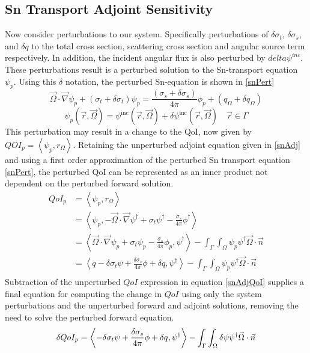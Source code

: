 \documentclass{article}
\newcommand{\vr}{\vec{r}}
\newcommand{\vO}{\vec{\Omega}}
\newcommand{\bra}{\left\langle}
\newcommand{\ket}{\right\rangle}
\newcommand{\vgrad}{\vec{\nabla}}
\newcommand{\sigt}{\sigma_t}
\newcommand{\sigs}{\sigma_s}
\newcommand{\angSource}{q_\Omega}
\newcommand{\scalSource}{q}
\newcommand{\angResp}{r_\Omega}
\begin{document}
\subsection{Sn Transport Adjoint Sensitivity}
Now consider perturbations to our system. Specifically perturbations of $\delta \sigt$, $\delta \sigs$, and $\delta q$ to the total cross section, scattering cross section and angular source term respectively. In addition, the incident angular flux is also perturbed by $delta \psi^{inc}$. These perturbations result is a perturbed solution to the Sn-transport equation $\psi_p$. Using this $\delta$ notation, the perturbed Sn-equation is shown in \ref{snPert}
\begin{equation}
\label{snPert}
\vO \cdot \vgrad \psi_p + \left( \sigt + \delta \sigt \right) \psi_p = \frac{\left( \sigs + \delta \sigs \right)}{4 \pi} \phi_p + \left( \angSource + \delta \angSource \right)
\end{equation}
\begin{equation}
\psi_p(\vr,\vO) = \psi^{\text{inc}}(\vr,\vO) + \delta \psi^{\text{inc}}(\vr,\vO)\quad \vr \in \Gamma
\end{equation}
This perturbation may result in a change to the QoI, now given by $QOI_p=\bra \psi_p , \angResp \ket$. Retaining the unperturbed adjoint equation given in \ref{snAdj} and using a first order approximation of the perturbed Sn transport equation \ref{snPert}, the perturbed QoI can be represented as an inner product not dependent on the perturbed forward solution.
\begin{equation}
\label{snSens}
\begin{split}
QoI_p &=\bra \psi_p , \angResp \ket \\
&=\bra \psi_p , - \vO \cdot \vgrad \psi^\dag + \sigt \psi^\dag - \frac{\sigs}{4 \pi} \phi^\dag  \ket \\
&= \bra  \vO \cdot \vgrad \psi_p + \sigt \psi_p - \frac{\sigs}{4 \pi} \phi_p , \psi^\dag  \ket - \int_{\Gamma} \int_{\Omega} \psi_p \psi^\dag \vO \cdot \vec{n}\\
&= \bra  \scalSource - \delta \sigt \psi + \frac{\delta\sigs}{4 \pi} \phi + \delta \scalSource , \psi^\dag  \ket - \int_{\Gamma} \int_{\Omega} \psi_p \psi^\dag \vO \cdot \vec{n}\\
\end{split}
\end{equation}
Subtraction of the unperturbed $QoI$ expression in equation \ref{snAdjQoI} supplies a final equation for computing the change in $QoI$ using only the system perturbations and the unperturbed forward and adjoint solutions, removing the need to solve the perturbed forward equation.
\begin{equation}
\delta QoI_p = \bra - \delta \sigt \psi + \frac{\delta\sigs}{4 \pi} \phi + \delta \scalSource , \psi^\dag  \ket - \int_{\Gamma} \int_{\Omega} \delta \psi \psi^\dag \vO \cdot \vec{n}\\
\end{equation}
\end{document}
